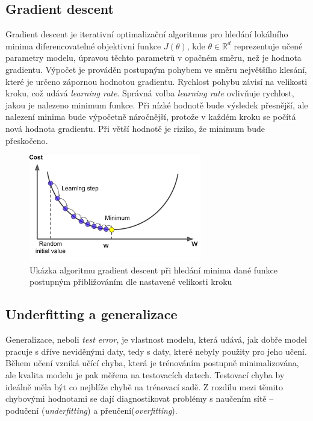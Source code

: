 \subsection*{Gradient descent}
Gradient descent je iterativní optimalizační algoritmus pro hledání lokálního minima diferencovatelné objektivní funkce $J(\theta)$, kde $\theta \in \mathbb{R}^d$ reprezentuje učené parametry modelu, úpravou těchto parametrů v opačném směru, než je hodnota gradientu. Výpočet je prováděn postupným pohybem ve směru největšího klesání, které je určeno zápornou hodnotou gradientu. Rychlost pohybu závisí na velikosti kroku, což udává \textit{learning rate}. Správná volba \textit{learning rate} ovlivňuje rychlost, jakou je nalezeno minimum funkce. Při nízké hodnotě bude výsledek přesnější, ale nalezení minima bude výpočetně náročnější, protože v každém kroku se počítá nová hodnota gradientu. Při větší hodnotě je riziko, že minimum bude přeskočeno\cite{ruder2016overview}.
\begin{figure}[H]
    \centering
    \includegraphics[scale=0.7]{obrazky-figures/gradientdescent.png}
    \caption{\label{fig:gradientdescent}Ukázka algoritmu gradient descent při hledání minima dané funkce postupným přibližováním dle nastavené velikosti kroku}
\end{figure}




\subsection{Underfitting a generalizace}
Generalizace, neboli \textit{test error}, je vlastnost modelu, která udává, jak dobře model pracuje s dříve neviděnými daty, tedy s daty, které nebyly použity pro jeho učení. Během učení vzniká učící chyba, která je trénováním postupně minimalizována, ale kvalita modelu je pak měřena na testovacích datech. 
Testovací chyba by ideálně měla být co nejblíže chybě na trénovací sadě. Z rozdílu mezi těmito chybovými hodnotami se dají diagnostikovat problémy s naučením sítě -- podučení (\textit{underfitting}) a přeučení(\textit{overfitting}). 

